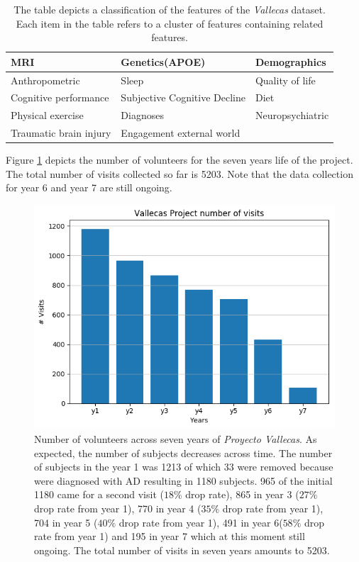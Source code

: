 \documentclass[11pt]{article}
\theoremstyle{definition}
\theoremstyle{remark}
\begin{document}
\begin{table}
\begin{tabular}{ |p{4.4cm}|p{4.4cm}|p{4.4cm}| }
\hline
\hline
MRI & Genetics(APOE) & Demographics  \\
\hline
Anthropometric & Sleep & Quality of life \\
\hline
Cognitive performance & Subjective Cognitive Decline  & Diet \\
\hline
Physical exercise & Diagnoses & Neuropsychiatric \\
\hline
Traumatic brain injury & Engagement external world &  \\
\hline

\hline
\end{tabular}
\caption{The table depicts a classification of the features of the \emph{Vallecas} dataset. Each item in the table refers to a cluster of features containing related features.}
\label{tab:vallecasvars}
\end{table}

Figure \ref{fig:pv5years} depicts the number of volunteers for the seven years life of the project. The total number of visits collected so far is 5203. Note that the data collection for year 6 and year 7 are still ongoing. 

\begin{figure}[H]
        \centering
        \includegraphics[keepaspectratio, width=0.6\linewidth]{figures/Fig_visits}
        \caption{Number of volunteers across seven years of \emph{Proyecto Vallecas}. As expected, the number of subjects decreases across time. The number of subjects in the year 1 was 1213 of which 33 were removed because were diagnosed with AD resulting in 1180 subjects. 965 of the initial 1180 came for a second visit ($18\%$ drop rate), 865 in year 3 ($27\%$ drop rate from year 1), 770 in year 4 ($35\%$ drop rate from year 1), 704 in year 5 ($40\%$ drop rate from year 1), 491 in year 6($58\%$ drop rate from year 1) and 195 in year 7 which at this moment still ongoing. The total number of visits in seven years amounts to 5203.} \label{fig:pv5years}
\end{figure}
\end{document}

